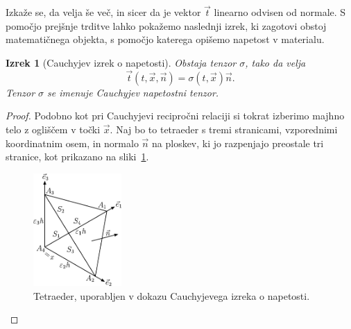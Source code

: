 \documentclass[12pt,a4paper,twoside]{article}
\theoremstyle{definition} %
\theoremstyle{plain} %
\newtheorem{izrek}[definicija]{Izrek}
\numberwithin{equation}{section}
\newcommand{\vt}{\vec{t}}
\newcommand{\vn}{\vec{n}}
\newcommand{\vx}{\vec{x}}
\newcommand{\ts}{\sigma}
\begin{document}
Izkaže se, da velja še več, in sicer da je vektor $\vt$ linearno odvisen od normale. S pomočjo
prejšnje trditve lahko pokažemo naslednji izrek, ki zagotovi obstoj matematičnega objekta,
s pomočjo katerega opišemo napetost v materialu.
\begin{izrek}[Cauchyjev izrek o napetosti]
  Obstaja tenzor $\ts$, tako da velja
  \begin{equation}
    \vt(t, \vx, \vn) = \ts(t, \vx)\vn.
  \end{equation}
  Tenzor $\ts$ se imenuje Cauchyjev napetostni tenzor.
\end{izrek}
\begin{proof}
Podobno kot pri Cauchyjevi recipročni relaciji si tokrat izberimo majhno telo z ogliščem v točki
$\vx$. Naj bo to tetraeder s tremi stranicami, vzporednimi koordinatnim osem, in normalo $\vn$ na
ploskev, ki jo razpenjajo preostale tri stranice, kot prikazano na sliki~\ref{fig:tetra}.

\begin{figure}[h]
  \centering
  \includegraphics[width=0.3\textwidth]{images/cauchy_tetrahedron.pdf}
  \caption{Tetraeder, uporabljen v dokazu Cauchyjevega izreka o napetosti.}
  \label{fig:tetra}
\end{figure}


\end{proof}
\end{document}
